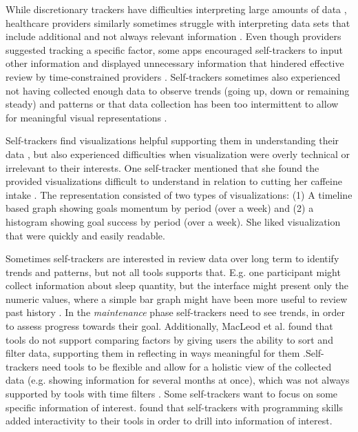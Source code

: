 While discretionary trackers have difficulties interpreting large amounts of data \citep{Choe2014}, healthcare providers similarly sometimes struggle with interpreting data sets that include additional and not always relevant information \citep{Chung2015, Chung2016}. Even though providers suggested tracking a specific factor, some apps encouraged self-trackers to input other information and displayed unnecessary information that hindered effective review by time-constrained providers \citep{Chung2016}. Self-trackers sometimes also experienced not having collected enough data to observe trends (going up, down or remaining steady) and patterns \citep{Li2011} or that data collection has been too intermittent to allow for meaningful visual representations \citep{Li2010}. 

Self-trackers find visualizations helpful supporting them in understanding their data \citep{Choe2014}, but also experienced difficulties when visualization were overly technical or irrelevant to their interests. 
One self-tracker mentioned that she found the provided visualizations difficult to understand in relation to cutting her caffeine intake \citep{MacLeod2014}. The representation consisted of two types of visualizations: (1) A timeline based graph showing goals momentum by period (over a week) and (2) a histogram showing goal success by period (over a week). She liked visualization that were quickly and easily readable.

Sometimes self-trackers are interested in review data over long term to identify trends and patterns, but not all tools supports that. E.g. one participant might collect information about sleep quantity, but the interface might present only the numeric values, where a simple bar graph might have been more useful to review past history \citep{Li2011}. In the \textit{maintenance} phase self-trackers need to see trends, in order to assess progress towards their goal. Additionally, MacLeod et al. found that tools do not support comparing factors by giving users the ability to sort and filter data, supporting them in reflecting in ways meaningful for them \citep{MacLeod2014}.Self-trackers need tools to be flexible and allow for a holistic view of the collected data (e.g. showing information for several months at once), which was not always supported by tools with time filters \citep{Li2010}. Some self-trackers want to focus on some specific information of interest. \citep{Whooley2014} found that self-trackers with programming skills added interactivity to their tools in order to drill into information of interest.

